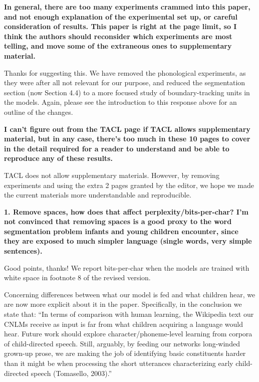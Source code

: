 \documentclass{article}
\begin{document}
\textbf{In general, there are too many experiments crammed into this paper, and not enough explanation of the experimental set up, or careful consideration of results.  This paper is right at the page limit, so I think the authors should reconsider which experiments are most telling, and move some of the extraneous ones to supplementary material.}

Thanks for suggesting this. We have removed the phonological experiments, as they were after all not relevant for our purpose, and reduced the segmentation section (now Section 4.4) to a more focused study of boundary-tracking units in the models. Again, please see the introduction to this response above for an outline of the changes.
\newline

\textbf{I can't figure out from the TACL page if TACL allows supplementary material, but in any case, there's too much in these 10 pages to cover in the detail required for a reader to understand and be able to reproduce any of these results.}

TACL does not allow supplementary materials. However, by removing experiments and using the extra 2 pages granted by the editor, we hope we made the current materials more understandable and reproducible.
\newline

\textbf{1. Remove spaces, how does that affect perplexity/bits-per-char? I'm not convinced that removing spaces is a good proxy to the word segmentation problem infants and young children encounter, since they are exposed to much simpler language (single words, very simple sentences).}

Good points, thanks! We report bits-per-char when the models are trained with white space in footnote 8 of the revised version.

Concerning differences between what our model is fed and what children hear, we are now more explicit about it in the paper. Specifically, in the conclusion we state that: ``In terms of  comparison with human learning, the Wikipedia text our CNLMs receive as input is far from what children acquiring a language would hear. Future work should explore character/phoneme-level learning from corpora of child-directed speech. Still, arguably, by feeding our networks long-winded grown-up prose, we are making the job of identifying basic constituents harder than it might be when processing the short utterances characterizing early child-directed speech (Tomasello, 2003).''
\end{document}
